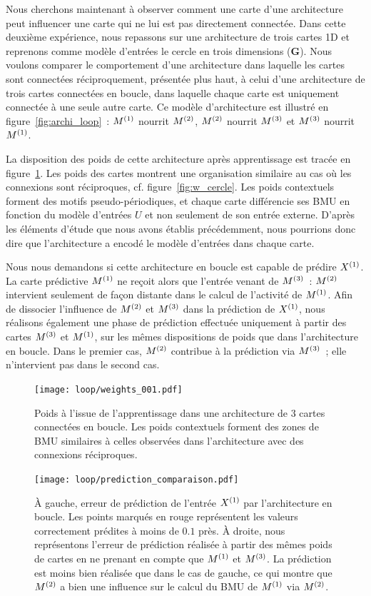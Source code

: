 \documentclass[../main]{subfiles}
\begin{document}
Nous cherchons maintenant à observer comment une carte d'une architecture peut influencer une carte qui ne lui est pas directement connectée.
Dans cette deuxième expérience, nous repassons sur une architecture de trois cartes 1D et reprenons comme modèle d'entrées le cercle en trois dimensions (\textbf{G}). 
Nous voulons comparer le comportement d'une architecture dans laquelle les cartes sont connectées réciproquement, présentée plus haut, à celui d'une architecture de trois cartes connectées en boucle, dans laquelle chaque carte est uniquement connectée à une seule autre carte. 
Ce modèle d'architecture est illustré en figure~\ref{fig:archi_loop}~: $M^{({1})}$ nourrit $M^{({2})}$, $M^{({2})}$ nourrit $M^{({3})}$ et $M^{({3})}$ nourrit $M^{({1})}$.

La disposition des poids de cette architecture après apprentissage est tracée en figure~\ref{fig:3som_loop}.
Les poids des cartes montrent une organisation similaire au cas où les connexions sont réciproques, cf. figure~\ref{fig:w_cercle}. Les poids contextuels forment des motifs pseudo-périodiques, et chaque carte différencie ses BMU en fonction du modèle d'entrées $U$ et non seulement de son entrée externe.
D'après les éléments d'étude que nous avons établis précédemment, nous pourrions donc dire que l'architecture a encodé le modèle d'entrées dans chaque carte.

Nous nous demandons si cette architecture en boucle est capable de prédire $X^{({1})}$. 
La carte prédictive $M^{({1})}$ ne reçoit alors que l'entrée venant de $M^{({3})}$~: $M^{({2})}$ intervient seulement de façon distante dans le calcul de l'activité de $M^{({1})}$.
Afin de dissocier l'influence de $M^{({2})}$ et $M^{({3})}$ dans la prédiction de $X^{({1})}$, nous réalisons également une phase de prédiction effectuée uniquement à partir des cartes $M^{({3})}$ et $M^{({1})}$, sur les mêmes dispositions de poids que dans l'architecture en boucle.
Dans le premier cas, $M^{({2})}$ contribue à la prédiction via $M^{({3})}$~; elle n'intervient pas dans le second cas.

\begin{figure}
	\centering\texttt{[image: loop/weights\_001.pdf]}
	\caption{Poids à l'issue de l'apprentissage dans une architecture de 3 cartes connectées en boucle. Les poids contextuels forment des zones de BMU similaires à celles observées dans l'architecture avec des connexions réciproques.\label{fig:3som_loop}}
\end{figure}
\begin{figure}
	\centering\texttt{[image: loop/prediction\_comparaison.pdf]}
	\caption{\`A gauche, erreur de prédiction de l'entrée $X^{({1})}$ par l'architecture en boucle. Les points marqués en rouge représentent les valeurs correctement prédites à moins de $0.1$ près. 
	\`A droite, nous représentons l'erreur de prédiction réalisée à partir des mêmes poids de cartes en ne prenant en compte que $M^{({1})}$ et $M^{({3})}$. La prédiction est moins bien réalisée que dans le cas de gauche, ce qui montre que $M^{({2})}$ a bien une influence sur le calcul du BMU de $M^{({1})}$ via $M^{({2})}$.
	\label{fig:pred_loop}}
\end{figure}
\end{document}
